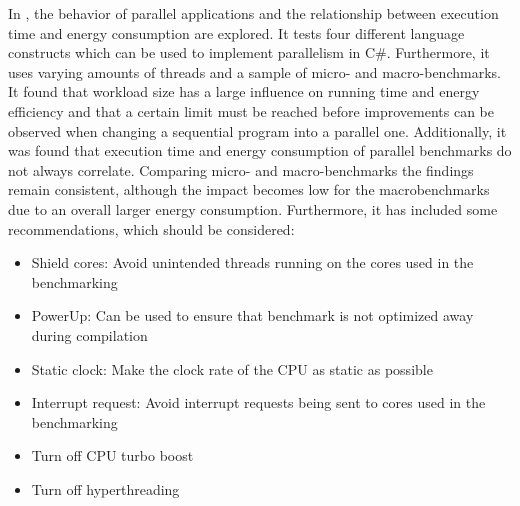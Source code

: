 In \cite{Lindholt}, the behavior of parallel applications and the relationship between execution time and energy consumption are explored. It tests four different language constructs which can be used to implement parallelism in C\#. Furthermore, it uses varying amounts of threads and a sample of micro- and macro-benchmarks. It found that workload size has a large influence on running time and energy efficiency and that a certain limit must be reached before improvements can be observed when changing a sequential program into a parallel one. Additionally, it was found that execution time and energy consumption of parallel benchmarks do not always correlate. Comparing micro- and macro-benchmarks the findings remain consistent, although the impact becomes low for the macrobenchmarks due to an overall larger energy consumption. Furthermore, it has included some recommendations, which should be considered:\cite{Lindholt}

\begin{itemize}
    \item Shield cores: Avoid unintended threads running on the cores used in the benchmarking
    \item PowerUp: Can be used to ensure that benchmark is not optimized away during compilation
    \item Static clock: Make the clock rate of the CPU as static as possible
    \item Interrupt request: Avoid interrupt requests being sent to cores used in the benchmarking 
    \item Turn off CPU turbo boost
    \item Turn off hyperthreading
\end{itemize}